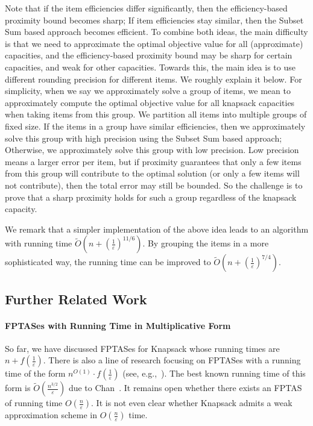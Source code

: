 \documentclass[a4paper,UKenglish,cleveref, autoref, thm-restate, pdfa]{lipics-v2021}
\newcommand{\eps}{\varepsilon}
\begin{document}
Note that if the item efficiencies differ significantly, then the efficiency-based proximity bound becomes sharp; If item efficiencies stay similar, then the Subset Sum based approach becomes efficient. To combine both ideas, the main difficulty is that we need to approximate the optimal objective value for all (approximate) capacities, and the efficiency-based proximity bound may be sharp for certain capacities, and weak for other capacities. Towards this, the main idea is to use different rounding precision for different items. We roughly explain it below. For simplicity, when we say we approximately solve a group of items, we mean to approximately compute the optimal objective value for all knapsack capacities when taking items from this group. We partition all items into multiple groups of fixed size. If the items in a group have similar efficiencies, then we approximately solve this group with high precision using the Subset Sum based approach; Otherwise, we approximately solve this group with low precision. Low precision means a larger error per item, but if proximity guarantees that only a few items from this group will contribute to the optimal solution (or only a few items will not contribute), then the total error may still be bounded. So the challenge is to prove that a sharp proximity holds for such a group regardless of the knapsack capacity. 


We remark that a simpler implementation of the above idea leads to an algorithm with running time $\tilde{O}(n + (\frac{1}{\eps})^{11/6})$. By grouping the items in a more sophisticated way, the running time can be improved to  $\tilde{O}(n + (\frac{1}{\eps})^{7/4})$.





\subsection{Further Related Work}
\paragraph*{FPTASes with Running Time in Multiplicative Form} So far, we have discussed FPTASes for Knapsack whose running times are $n+f(\frac{1}{\eps})$. There is also a line of research focusing on FPTASes with a running time of the form $n^{O(1)}\cdot f(\frac{1}{\eps})$ (see, e.g.,~\cite{Law79,KP99,Chan18}). The best known running time of this form is $\tilde{O}(\frac{n^{3/2}}{\eps})$ due to Chan~\cite{Chan18}. It remains open whether there exists an FPTAS of running time $O(\frac{n}{\eps})$.  It is not even clear whether Knapsack admits a weak approximation scheme in $O(\frac{n}{\eps})$ time.
\end{document}
